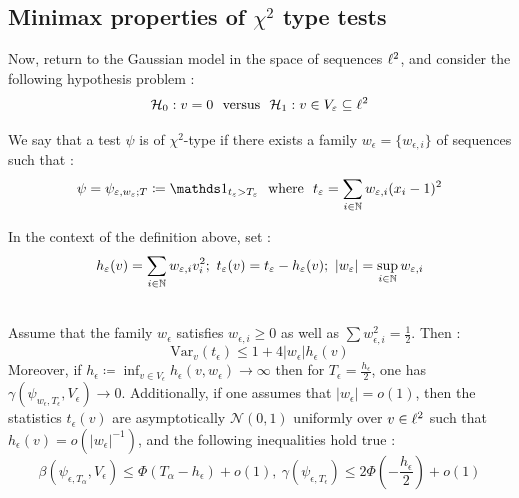 \subsection{Minimax properties of \texorpdfstring{$\chi^2$}{chi-square} type tests}
Now, return to the Gaussian model in the space of sequences $\ell^2$, and consider the following hypothesis problem : 
\begin{equation*}
    \H_0 : v = 0 \ \text{ versus } \ \H_1 : v \in V_\epsilon \subseteq \l^2
\end{equation*}
\begin{definition}
    We say that a test $\psi$ is of $\chi^2$-type if there exists a family $w_\epsilon = \{w_{\epsilon,i}\}$ of sequences such that : \begin{equation*}
        \psi = \psi_{\epsilon,w_\epsilon;T} \coloneqq \ind{t_\epsilon > T_\epsilon} \ \text{ where } \ t_\epsilon = \sum_{i \in \N} w_{\epsilon,i}(x_i-1)^2
    \end{equation*}
\end{definition}
In the context of the definition above, set : \begin{equation*}
    h_\epsilon(v) = \sum_{i \in \N} w_{\epsilon,i}v_i^2; \ t_\epsilon(v) = t_\epsilon - h_\epsilon(v); \ |w_\epsilon| = \sup_{i \in \N} w_{\epsilon,i}
\end{equation*}
\begin{lemma}\citet[Lemma 3.1 \& Corollary 3.3]{Ing2012}\\
    Assume that the family $w_\epsilon$ satisfies $w_{\epsilon,i} \geq 0$ as well as $\sum w_{\epsilon,i}^2 = \frac{1}{2}$. Then : \begin{equation}\label{chi2minimax1}
        \text{Var}_v(t_\epsilon) \leq 1 + 4 |w_\epsilon| h_\epsilon(v)
    \end{equation}
    Moreover, if $h_\epsilon \coloneqq \inf_{v \in V_\epsilon} h_\epsilon(v,w_\epsilon) \rightarrow \infty$ then for $T_\epsilon = \frac{h_\epsilon}{2}$, one has $\gamma(\psi_{w_\epsilon,T_\epsilon},V_\epsilon)\rightarrow 0$. 
    Additionally, if one assumes that $|w_\epsilon|= o(1)$, then the statistics $t_\epsilon(v)$ are asymptotically $\mathcal{N}(0,1)$ uniformly over $v\in \ell^2$ such that $h_\epsilon(v) = o(|w_\epsilon|^{-1})$, and the following inequalities hold true : 
    \begin{equation*}
        \beta(\psi_{\epsilon,T_\alpha},V_\epsilon) \leq \Phi(T_\alpha-h_\epsilon)+o(1), \ \gamma(\psi_{\epsilon,T_\epsilon}) \leq 2\Phi(-\frac{h_\epsilon}{2})+o(1)
    \end{equation*}
\end{lemma}
